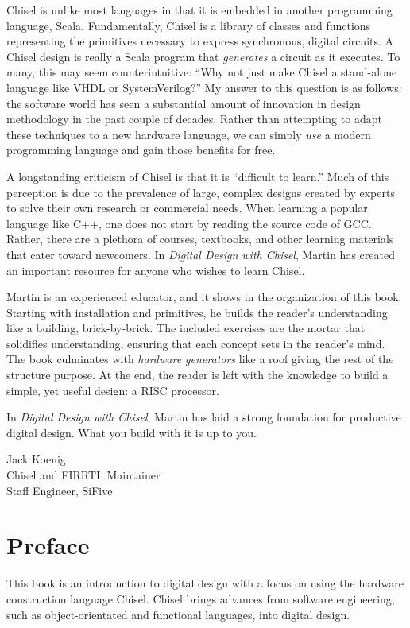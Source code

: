 \documentclass[%
    10pt,
    headinclude, footexclude,
    openright, %
    notitlepage,
    cleardoubleempty,
    headsepline,
    pointlessnumbers,
    bibtotoc, idxtotoc,
    ]{scrbook}
\begin{document}
Chisel is unlike most languages in that it is embedded in another programming language, Scala. Fundamentally, Chisel is a library of classes and functions representing the primitives necessary to express synchronous, digital circuits. A Chisel design is really a Scala program that \emph{generates} a circuit as it executes. To many, this may seem counterintuitive: ``Why not just make Chisel a stand-alone language like VHDL or SystemVerilog?'' My answer to this question is as follows: the software world has seen a substantial amount of innovation in design methodology in the past couple of decades. Rather than attempting to adapt these techniques to a new hardware language, we can simply \emph{use} a modern programming language and gain those benefits for free.

A longstanding criticism of Chisel is that it is ``difficult to learn.'' Much of this perception is due to the prevalence of large, complex designs created by experts to solve their own research or commercial needs. When learning a popular language like C++, one does not start by reading the source code of GCC. Rather, there are a plethora of courses, textbooks, and other learning materials that cater toward newcomers. In \emph{Digital Design with Chisel}, Martin has created an important resource for anyone who wishes to learn Chisel.

Martin is an experienced educator, and it shows in the organization of this book. Starting with installation and primitives, he builds the reader's understanding like a building, brick-by-brick. The included exercises are the mortar that solidifies understanding, ensuring that each concept sets in the reader's mind. The book culminates with \emph{hardware generators} like a roof giving the rest of the structure purpose. At the end, the reader is left with the knowledge to build a simple, yet useful design: a RISC processor.

In \emph{Digital Design with Chisel}, Martin has laid a strong foundation for productive digital design. What you build with it is up to you.

\medskip
\noindent Jack Koenig\\
Chisel and FIRRTL Maintainer\\
Staff Engineer, SiFive


\chapter{Preface}

This book is an introduction to digital design with a focus on using the hardware construction language Chisel. Chisel brings advances from software engineering, such as object-orientated and functional languages, into digital design.
\end{document}

